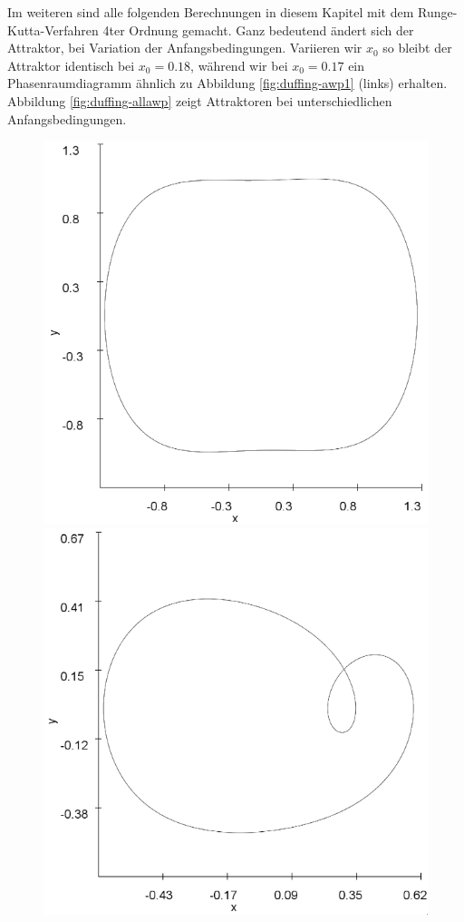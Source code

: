 \documentclass{scrartcl}
\begin{document}
\newline
Im weiteren sind alle folgenden Berechnungen in diesem Kapitel mit dem Runge-Kutta-Verfahren 4ter Ordnung gemacht.
\newline
Ganz bedeutend ändert sich der Attraktor, bei Variation der Anfangsbedingungen. Variieren wir $x_0$ so bleibt der Attraktor identisch bei $x_0=0.18$, während wir bei $x_0=0.17$ ein Phasenraumdiagramm ähnlich zu Abbildung \ref{fig:duffing-awp1} (links) erhalten.
\newline
Abbildung \ref{fig:duffing-allawp} zeigt Attraktoren bei unterschiedlichen Anfangsbedingungen.
\begin{figure}[!htbp]
\includegraphics[scale=0.4]{duffing-awp2-500k-nach-500k-h0,01-runge}
\includegraphics[scale=0.4]{duffing-awp3-500k-nach-500k-h0,01-runge}

\end{figure}
\end{document}
